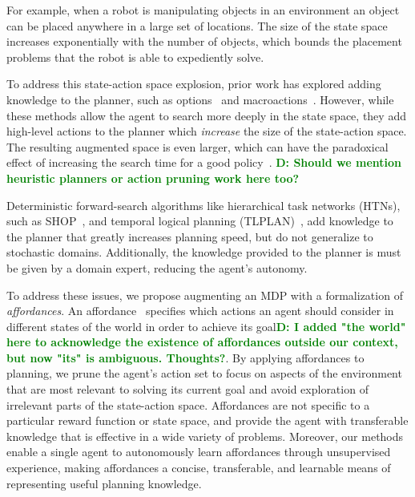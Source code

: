 \documentclass[conference]{IEEEtran}
\newcommand{\dnote}[1]{\textcolor{Green}{\textbf{D: #1}}}
\begin{document}
For example, when a robot is manipulating objects in an environment
an object can be placed anywhere in a large set of locations. The size
of the state space increases exponentially with the number of objects,
which bounds the placement problems that the robot is able to expediently solve.

To address this state-action space explosion, prior work has explored adding knowledge to the planner,
such as options~\cite{sutton99} and macroactions~\cite{Botea:2005kx,Newton:2005vn}. 
However, while these methods allow the agent to search more deeply in the state
space, they add high-level actions to the planner which {\em increase} the size of the state-action space.
The resulting augmented space is even larger, which can have
the paradoxical effect of increasing the search time for a good
policy~\cite{Jong:2008zr}.
\dnote{Should we mention heuristic planners or action pruning work here too?}

Deterministic forward-search algorithms like hierarchical task networks (HTNs),
such as SHOP~\citep{Nau:1999:SSH:1624312.1624357}, and
temporal logical planning (TLPLAN)~\citep{Bacchus95usingtemporal,Bacchus99usingtemporal}, add
knowledge to the planner that greatly increases planning speed, but do not
generalize to stochastic domains. Additionally, the knowledge provided to the planner is must be given by a domain expert,
reducing the agent's autonomy.

To address these issues, we propose augmenting an MDP
with a formalization of {\em affordances}. An
affordance~\cite{gibson77} specifies which actions an agent should consider in
different states of the world in order to achieve its goal\dnote{I added "the world" here to acknowledge
the existence of affordances outside our context, but now "its" is ambiguous. Thoughts?}.
By applying affordances to planning, we prune the agent's action set to
focus on aspects of the environment that
are most relevant to solving its current goal and avoid
exploration of irrelevant parts of the state-action space.
Affordances are not specific to a particular reward
function or state space, and provide the agent with transferable
knowledge that is effective in a wide variety of problems. Moreover, 
our methods enable a single agent to autonomously learn affordances
through unsupervised experience, making affordances a concise, transferable, and
learnable means of representing useful planning knowledge.

\end{document}
